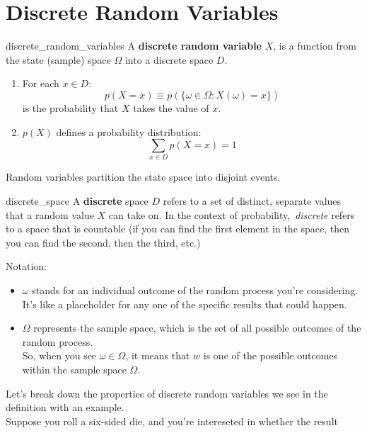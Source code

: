 \documentclass{mlnotes}
\begin{document}
\section{Discrete Random Variables}
\begin{definition}{}{discrete_random_variables}
A \textbf{discrete random variable} \(X\), is a function from the state (sample)
space \(\Omega\) into a discrete space \(D\).

\begin{enumerate}
  \item For each \(x \in D\):
    \[p(X = x) \equiv p(\{\omega \in \Omega : X(\omega) = x\})\]
  is the probability that \(X\) takes the value of \(x\).

  \item \(p(X)\) defines a probability distribution:
  \[
    \sum_{x \in D} p(X = x) = 1
  \]
\end{enumerate}

Random variables partition the state space into disjoint events.

\begin{definition}{}{discrete_space}
  A \textbf{discrete} space \(D\) refers to a set of distinct, separate values that a
  random value \(X\) can take on. In the context of probability,\
  \emph{discrete} refers to a space that is countable (if you can find the
  first element in the space, then you can find the second, then the third, etc.)
\end{definition}

Notation:
\begin{itemize}
  \item \(\omega\) stands for an individual outcome of the random process you're
  considering. It's like a placeholder for any one of the specific results that
  could happen.
  \item \(\Omega\) represents the sample space, which is the set of all possible
  outcomes of the random process.
  \\[12pt]
  So, when you see \(\omega \in \Omega\), it means that \(w\) is one of the
  possible outcomes within the sample space \(\Omega\).
\end{itemize}
\end{definition}
Let's break down the properties of discrete random variables we see in the
definition with an example.
\\[12pt]
Suppose you roll a six-sided die, and you're intereseted in whether the result
\end{document}
